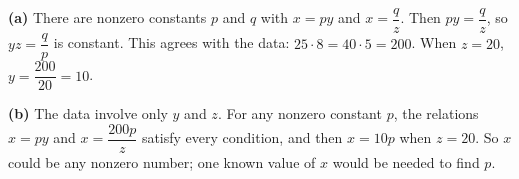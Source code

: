 \textbf{(a)} There are nonzero constants $p$ and $q$ with $x=py$ and $x=\dfrac qz$. Then $py=\dfrac qz$, so $yz=\dfrac qp$ is constant. This agrees with the data: $25\cdot8=40\cdot5=200$. When $z=20$, $y=\dfrac{200}{20}=\boxed{10}$.

\textbf{(b)} The data involve only $y$ and $z$. For any nonzero constant $p$, the relations $x=py$ and $x=\dfrac{200p}{z}$ satisfy every condition, and then $x=10p$ when $z=20$. So $x$ could be any nonzero number; one known value of $x$ would be needed to find $p$.
